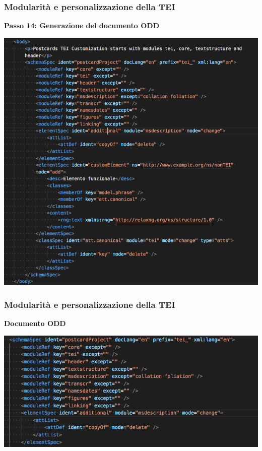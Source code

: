 \begin{frame}
    \frametitle{Modularità e personalizzazione della TEI}
    \addtocounter{nframe}{1}
    
    \textbf{Passo 14: Generazione del documento ODD}

     \begin{center}
        \includegraphics[width=.65\textwidth]{imgs/CustomizationODD.png}
     \end{center}
    
\end{frame}


\begin{frame}
    \frametitle{Modularità e personalizzazione della TEI}
    \addtocounter{nframe}{1}
    
    \textbf{Documento ODD}

     \begin{center}
        \includegraphics[width=.97\textwidth]{imgs/CustomizationODD-1.png}
     \end{center}
    
\end{frame}

